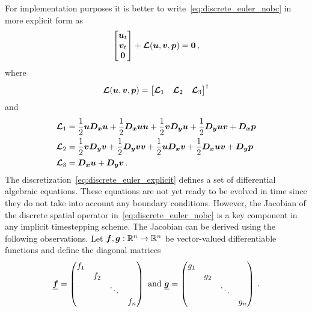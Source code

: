 For implementation purposes it is better to write~\eqref{eq:discrete_euler_nobc} in more explicit form as
  \begin{equation}
    \label{eq:discrete_euler_explicit}
    \begin{bmatrix}
      \bm{u}_t \\
      \bm{v}_t \\
      \bm{0}
    \end{bmatrix}
    + \bm{\mathcal{L}}(\bm{u}, \bm{v}, \bm{p}) = \bm{0} \,,
  \end{equation}
  where
  \begin{equation*}
    \bm{\mathcal{L}}(\bm{u}, \bm{v}, \bm{p}) =
    \begin{bmatrix}
      \bm{\mathcal{L}}_1 & \bm{\mathcal{L}}_2 & \bm{\mathcal{L}}_3
    \end{bmatrix}^\dagger
  \end{equation*}
  and
  \begin{equation*}
    \begin{aligned}
      \bm{\mathcal{L}}_1 &= \frac{1}{2} \bm{u} \bm{D_x} \bm{u} + \frac{1}{2} \bm{D_x} \bm{u} \bm{u} + \frac{1}{2} \bm{v} \bm{D_y} \bm{u} + \frac{1}{2} \bm{D_y} \bm{u} \bm{v} + \bm{D_x} \bm{p} \\
      \bm{\mathcal{L}}_2 &= \frac{1}{2} \bm{v} \bm{D_y} \bm{v} + \frac{1}{2} \bm{D_y} \bm{v} \bm{v} + \frac{1}{2} \bm{u} \bm{D_x} \bm{v} + \frac{1}{2} \bm{D_x} \bm{u} \bm{v} + \bm{D_y} \bm{p} \\
      \bm{\mathcal{L}}_3 &= \bm{D_x} \bm{u} + \bm{D_y} \bm{v} \,.
    \end{aligned}
  \end{equation*}
\noindent The discretization~\eqref{eq:discrete_euler_explicit} defines a set of differential algebraic equations. These equations are not yet ready to be evolved in time since they do not take into account any boundary conditions. However, the Jacobian of the discrete spatial operator in~\eqref{eq:discrete_euler_nobc} is a key component in any implicit timestepping scheme. The Jacobian can be derived using the following observations. Let $\bm{f}, \bm{g} : \mathbb{R}^n \to \mathbb{R}^n$ be vector-valued differentiable functions and define the diagonal matrices
\[
  \underline{\bm{f}} =
  \begin{pmatrix}
    f_1 &     &        &     \\
        & f_2 &        &     \\
        &     & \ddots &     \\
        &     &        & f_n \\
  \end{pmatrix}
  \text{ and }
  \underline{\bm{g}} =
  \begin{pmatrix}
    g_1 &     &        &     \\
        & g_2 &        &     \\
        &     & \ddots &     \\
        &     &        & g_n \\
  \end{pmatrix} \,.
\]
